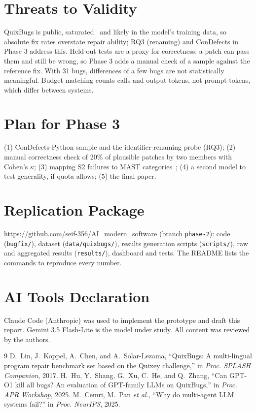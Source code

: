\documentclass[conference]{IEEEtran}
\begin{document}
\section{Threats to Validity}
QuixBugs is public, saturated~\cite{gpto1} and likely in the model's training
data, so absolute fix rates overstate repair ability; RQ3 (renaming) and
ConDefects in Phase 3 address this. Held-out tests are a proxy for correctness:
a patch can pass them and still be wrong, so Phase 3 adds a manual check of a
sample against the reference fix. With 31 bugs, differences of a few bugs are
not statistically meaningful. Budget matching counts calls and output tokens,
not prompt tokens, which differ between systems.

\section{Plan for Phase 3}
(1) ConDefects-Python sample and the identifier-renaming probe (RQ3);
(2) manual correctness check of 20\% of plausible patches by two members with
Cohen's $\kappa$; (3) mapping S2 failures to MAST categories~\cite{mast};
(4) a second model to test generality, if quota allows; (5) the final paper.

\section{Replication Package}\label{sec:repl}
\url{https://github.com/seif-356/AI_modern_software} (branch \texttt{phase-2}):
code (\texttt{bugfix/}), dataset (\texttt{data/quixbugs/}), results generation
scripts (\texttt{scripts/}), raw and aggregated results (\texttt{results/}),
dashboard and tests. The README lists the commands to reproduce every number.

\section*{AI Tools Declaration}
Claude Code (Anthropic) was used to implement the prototype and draft this
report. Gemini 3.5 Flash-Lite is the model under study. All content was
reviewed by the authors.

\begin{thebibliography}{9}
D.~Lin, J.~Koppel, A.~Chen, and A.~Solar-Lezama, ``QuixBugs: A multi-lingual
program repair benchmark set based on the Quixey challenge,'' in \emph{Proc.
SPLASH Companion}, 2017.
H.~Hu, Y.~Shang, G.~Xu, C.~He, and Q.~Zhang, ``Can GPT-O1 kill all bugs? An
evaluation of GPT-family LLMs on QuixBugs,'' in \emph{Proc. APR Workshop}, 2025.
M.~Cemri, M.~Pan \emph{et al.}, ``Why do multi-agent LLM systems fail?'' in
\emph{Proc. NeurIPS}, 2025.
\end{thebibliography}
\end{document}
